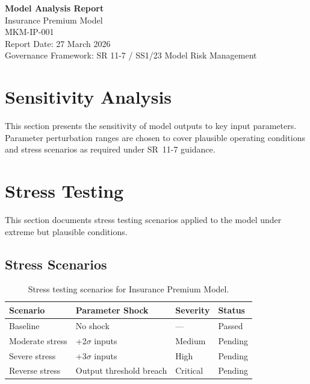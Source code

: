 \documentclass[11pt,a4paper]{article}
\begin{document}
\begin{center}
{\Large\textbf{Model Analysis Report}}\\[6pt]
{\large\textcolor{mkmblue}{Insurance Premium Model}}\\[4pt]
{\normalsize MKM-IP-001}\\[12pt]
{\small Report Date: 27 March 2026}\\[4pt]
{\footnotesize Governance Framework: SR 11-7 / SS1/23 Model Risk Management}
\end{center}

\vspace{8mm}
\tableofcontents
\newpage

\section{Sensitivity Analysis}

This section presents the sensitivity of model outputs to key input parameters.
Parameter perturbation ranges are chosen to cover plausible operating conditions
and stress scenarios as required under SR~11-7 guidance.




\section{Stress Testing}

This section documents stress testing scenarios applied to the model
under extreme but plausible conditions.

\subsection{Stress Scenarios}

\begin{table}[H]
    \centering
    \caption{Stress testing scenarios for Insurance Premium Model.}
    \begin{tabular}{llll}
        \toprule
        \textbf{Scenario} & \textbf{Parameter Shock} & \textbf{Severity} & \textbf{Status} \\
        \midrule
        Baseline & No shock & --- & Passed \\
        Moderate stress & +2$\sigma$ inputs & Medium & Pending \\
        Severe stress & +3$\sigma$ inputs & High & Pending \\
        Reverse stress & Output threshold breach & Critical & Pending \\
        \bottomrule
    \end{tabular}
\end{table}
\end{document}
